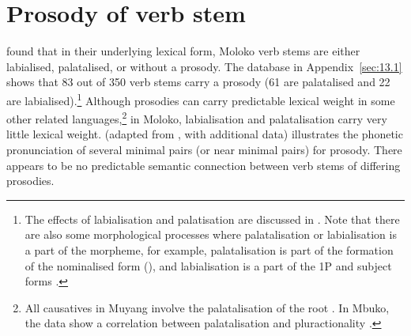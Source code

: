\section{Prosody of verb stem}\label{sec:6.6}
\hypertarget{RefHeading1212001525720847}{}
\largerpage[2] \citet{Bow1997c} found that in their underlying lexical form, Moloko verb stems are either labialised, palatalised, or without a prosody.  The database in Appendix~\ref{sec:13.1} shows that 83 out of 350 verb stems carry a prosody (61 are palatalised and 22 are labialised).\footnote{The effects of labialisation and palatisation are discussed in . Note that there are also some morphological processes where palatalisation or labialisation is a part of the morpheme, for example, palatalisation is part of the formation of the nominalised form (), and labialisation is a part of the 1P and {\twoP} subject forms .} Although prosodies can carry predictable lexical weight in some other related languages,\footnote{All causatives in Muyang involve the palatalisation of the root \citep{Smith2002}. In Mbuko, the data show a correlation between palatalisation and pluractionality \citep{Gravina2001}.} in Moloko, labialisation and palatalisation carry very little lexical weight.  (adapted from \citealt{Bow1997c}, with additional data) illustrates the phonetic pronunciation of several minimal pairs (or near minimal pairs) for prosody. There appears to be no predictable semantic connection between verb stems of differing prosodies. 

